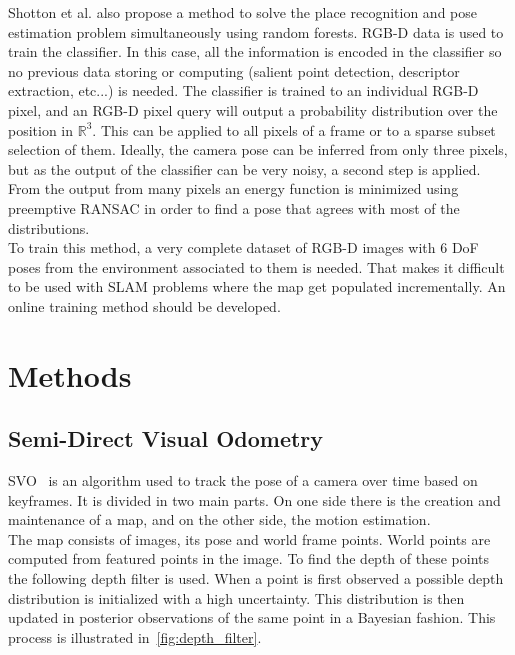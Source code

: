 Shotton et al. \cite{Shotton2013} also propose a method to solve the place recognition and pose estimation problem simultaneously using random forests. RGB-D data is used to train the classifier. In this case, all the information is encoded in the classifier so no previous data storing or computing (salient point detection, descriptor extraction, etc...) is needed. The classifier is trained to an individual RGB-D pixel, and an RGB-D pixel query will output a probability distribution over the position in $\mathbb{R}^3$. This can be applied to all pixels of a frame or to a sparse subset selection of them. Ideally, the camera pose can be inferred from only three pixels, but as the output of the classifier can be very noisy, a second step is applied. From the output from many pixels an energy function is minimized using preemptive RANSAC in order to find a pose that agrees with most of the distributions.\\

To train this method, a very complete dataset of RGB-D images with 6 DoF poses from the environment associated to them is needed. That makes it difficult to be used with SLAM problems where the map get populated incrementally. An online training  method should be developed.\\


\section{Methods}
\label{sec:methods}


\subsection{Semi-Direct Visual Odometry}
\label{ssub:semi_direct_visual_odometry}

SVO~\cite{Forster2014} is an algorithm used to track the pose of a camera over time based on keyframes. It is divided in two main parts. On one side there is the creation and maintenance of a map, and on the other side, the motion estimation. \\

The map consists of images, its pose and world frame points. World points are computed from featured points in the image. To find the depth of these points the following depth filter is used. When a point is first observed a possible depth distribution is initialized with a high uncertainty. This distribution is then updated in posterior observations of the same point in a Bayesian fashion. This process is illustrated in~\ref{fig:depth_filter}.\\ 

